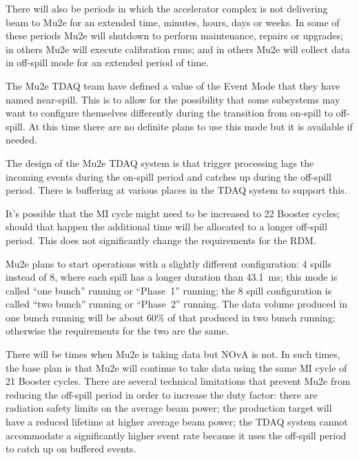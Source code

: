 There will also be periods in which the accelerator complex is not delivering
beam to Mu2e for an extended time, minutes, hours, days or weeks.
In some of these periods Mu2e will shutdown to perform maintenance, repairs or upgrades;
in others Mu2e will execute calibration runs;
and in others Mu2e will collect data in off-spill mode for an extended period of time.


The Mu2e TDAQ team have defined a value of the Event Mode that they have named near-spill.
This is to allow for the possibility that some subsystems may want to
configure themselves differently during the transition from on-spill to off-spill.
At this time there are no definite plans to use this mode but it is available if needed.

The design of the Mu2e TDAQ system is that trigger processing lags the incoming events
during the on-spill period and catches up during the off-spill period.  There is
buffering at various places in the TDAQ system to support this.

It's possible that the MI cycle might need to be increased to 22 Booster cycles;
should that happen the additional time will be allocated to a longer off-spill period.
This does not significantly change the requirements for the RDM.

Mu2e plans to start operations with a slightly different configuration:
4 spills instead of 8, where each spill has a longer duration than 43.1~ms;
this mode is called ``one bunch'' running or ``Phase~1'' running;
the 8 spill configuration is called ``two bunch'' running or ``Phase~2'' running.
The data volume produced in one bunch running will be about 60\% of that produced
in two bunch running; otherwise the requirements for the two are the same.

There will be times when Mu2e is taking data but NOvA is not.
In such times, the base plan is that Mu2e will continue to take data using the same MI cycle of 21 Booster cycles.
There are several technical limitations that prevent Mu2e from reducing the off-spill period
in order to increase the duty factor:
there are radiation safety limits on the average beam power;
the production target will have a reduced lifetime at higher average beam power;
the TDAQ system cannot accommodate a significantly higher event rate because it
uses the off-spill period to catch up on buffered events.


